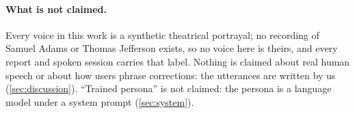 \begin{table}[t]
\centering\small

\caption{The claims of this paper, their status and their gate. T: teaching; S: how the agent speaks; L: latency; N: a negative result.}
\label{tab:claims}
\end{table}

\paragraph{What is not claimed.}
Every voice in this work is a synthetic theatrical portrayal; no recording of Samuel Adams or Thomas Jefferson exists, so no voice here is theirs, and every
report and spoken session carries that label. Nothing is claimed about real human speech or about how users phrase corrections: the utterances are written by us
(\cref{sec:discussion}). ``Trained persona'' is not claimed: the persona is a language model under a system prompt (\cref{sec:system}).
